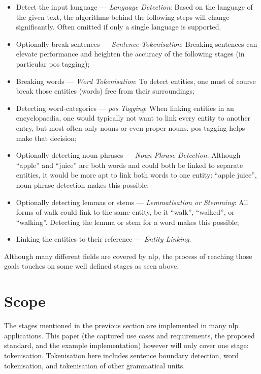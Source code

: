 \begin{itemize}
\itemsep1pt\parskip0pt
\item
  Detect the input language --- \emph{Language Detection}: Based on the
  language of the given text, the algorithms behind the following steps
  will change significantly. Often omitted if only a single language is
  supported.
\item
  Optionally break sentences --- \emph{Sentence Tokenisation}: Breaking
  sentences can elevate performance and heighten the accuracy of the
  following stages (in particular \gls{pos} tagging);
\item
  Breaking words --- \emph{Word Tokenisation}: To detect entities, one
  must of course break those entities (words) free from their
  surroundings;
\item
  Detecting word-categories --- \emph{\acrfull{pos} Tagging}: When
  linking entities in an encyclopaedia, one would typically not want to
  link every entity to another entry, but most often only nouns or even
  proper nouns. \gls{pos} tagging helps make that decision;
\item
  Optionally detecting noun phrases --- \emph{Noun Phrase Detection}:
  Although ``apple'' and ``juice'' are both words and could both be
  linked to separate entities, it would be more apt to link both words
  to one entity: ``apple juice'', noun phrase detection makes this
  possible;
\item
  Optionally detecting lemmas or stems --- \emph{Lemmatisation or
  Stemming}: All forms of walk could link to the same entity, be it
  ``walk'', ``walked'', or ``walking''. Detecting the lemma or stem for
  a word makes this possible;
\item
  Linking the entities to their reference --- \emph{Entity Linking}.
\end{itemize}

Although many different fields are covered by \gls{nlp}, the process of
reaching those goals touches on some well defined stages as seen above.

\section{Scope}\label{scope}

The stages mentioned in the previous section are implemented in many
\gls{nlp} applications. This paper (the captured use cases and
requirements, the proposed standard, and the example implementation)
however will only cover one stage: tokenisation. Tokenisation here
includes sentence boundary detection, word tokenisation, and
tokenisation of other grammatical units.

